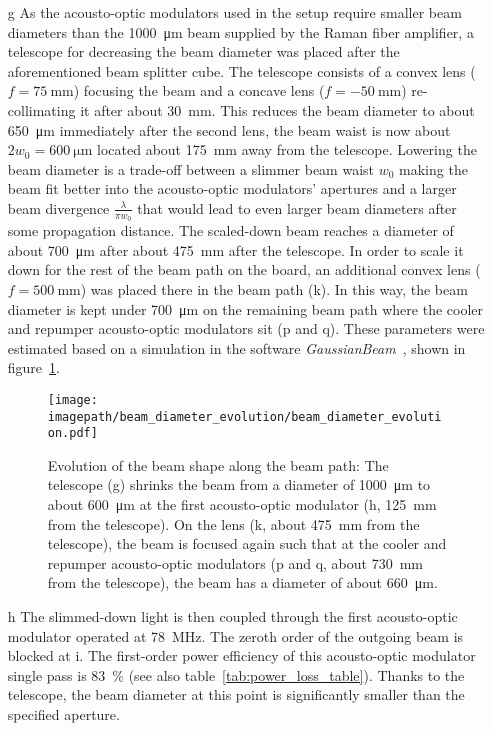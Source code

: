 \begin{itemize}
    \item[g] As the acousto-optic modulators used in the setup require smaller beam diameters than the \SI{1000}{\micro\meter} beam supplied by the Raman fiber amplifier, a telescope for decreasing the beam diameter was placed after the aforementioned beam splitter cube. The telescope consists of a convex lens ($f = \SI{75}{\milli\meter}$) focusing the beam and a concave lens ($f = \SI{-50}{\milli\meter}$) re-collimating it after about \SI{30}{\milli\meter}. This reduces the beam diameter to about \SI{650}{\micro\meter} immediately after the second lens, the beam waist is now about $2w_0 = \SI{600}{\micro\meter}$ located about \SI{175}{\milli\meter} away from the telescope. Lowering the beam diameter is a trade-off between a slimmer beam waist $w_0$ making the beam fit better into the acousto-optic modulators' apertures and a larger beam divergence $\frac{\lambda}{\pi w_0}$ that would lead to even larger beam diameters after some propagation distance. The scaled-down beam reaches a diameter of about \SI{700}{\micro\meter} after about \SI{475}{\milli\meter} after the telescope. In order to scale it down for the rest of the beam path on the board, an additional convex lens ($f = \SI{500}{\milli\meter}$) was placed there in the beam path (k). In this way, the beam diameter is kept under \SI{700}{\micro\meter} on the remaining beam path where the cooler and repumper acousto-optic modulators sit (p and q).  These parameters were estimated based on a simulation in the software \textit{GaussianBeam}~\cite{noauthor_gaussianbeam_nodate}, shown in figure~\ref{fig:beam_diameter_evolution}.

\begin{figure}
    \centering
    \texttt{[image: \\imagepath/beam\_diameter\_evolution/beam\_diameter\_evolution.pdf]}
    \caption{Evolution of the beam shape along the beam path: The telescope (g) shrinks the beam from a diameter of \SI[]{1000}{\micro\meter} to about \SI[]{600}{\micro\meter} at the first acousto-optic modulator (h, \SI[]{125}{\milli\meter} from the telescope). On the lens (k, about \SI{475}{\milli\meter} from the telescope), the beam is focused again such that at the cooler and repumper acousto-optic modulators (p and q, about \SI[]{730}{\milli\meter} from the telescope), the beam has a diameter of about \SI[]{660}{\micro\meter}.}
    \label{fig:beam_diameter_evolution}
\end{figure}

    \item[h] The slimmed-down light is then coupled through the first acousto-optic modulator operated at \SI{+78}{\mega\hertz}. The zeroth order of the outgoing beam is blocked at i. The first-order power efficiency of this acousto-optic modulator single pass is \SI{83}{\percent} (see also table~\ref{tab:power_loss_table}). Thanks to the telescope, the beam diameter at this point is significantly smaller than the specified aperture.
    

\end{itemize}
